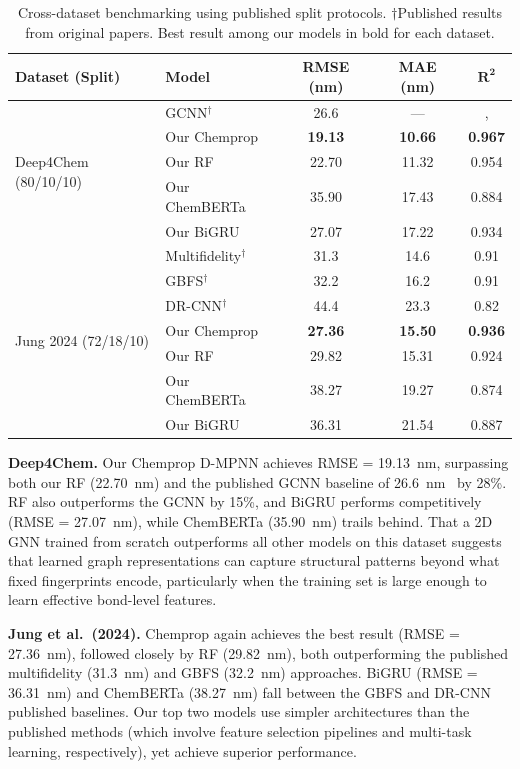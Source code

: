 \documentclass[journal=jcisd8,manuscript=article]{achemso}
\begin{document}
\begin{table}[htbp]
\centering
\caption{Cross-dataset benchmarking using published split protocols. $\dagger$Published results from original papers. Best result among our models in bold for each dataset.}
\label{tab:cross_dataset}
\begin{tabular}{llccc}
\toprule
\textbf{Dataset (Split)} & \textbf{Model} & \textbf{RMSE (nm)} & \textbf{MAE (nm)} & $\boldsymbol{R^2}$ \\
\midrule
\multirow{5}{*}{Deep4Chem (80/10/10)}
 & GCNN$^\dagger$ & 26.6 & --- &, \\
 & Our Chemprop & \textbf{19.13} & \textbf{10.66} & \textbf{0.967} \\
 & Our RF & 22.70 & 11.32 & 0.954 \\
 & Our ChemBERTa & 35.90 & 17.43 & 0.884 \\
 & Our BiGRU & 27.07 & 17.22 & 0.934 \\
\midrule
\multirow{7}{*}{Jung 2024 (72/18/10)}
 & Multifidelity$^\dagger$ & 31.3 & 14.6 & 0.91 \\
 & GBFS$^\dagger$ & 32.2 & 16.2 & 0.91 \\
 & DR-CNN$^\dagger$ & 44.4 & 23.3 & 0.82 \\
 & Our Chemprop & \textbf{27.36} & \textbf{15.50} & \textbf{0.936} \\
 & Our RF & 29.82 & 15.31 & 0.924 \\
 & Our ChemBERTa & 38.27 & 19.27 & 0.874 \\
 & Our BiGRU & 36.31 & 21.54 & 0.887 \\
\bottomrule
\end{tabular}
\end{table}

\textbf{Deep4Chem.}
Our Chemprop D-MPNN achieves RMSE = 19.13~nm, surpassing both our RF (22.70~nm) and the published GCNN baseline of 26.6~nm~\cite{joung2021deep} by 28\%.
RF also outperforms the GCNN by 15\%, and BiGRU performs competitively (RMSE = 27.07~nm), while ChemBERTa (35.90~nm) trails behind.
That a 2D GNN trained from scratch outperforms all other models on this dataset suggests that learned graph representations can capture structural patterns beyond what fixed fingerprints encode, particularly when the training set is large enough to learn effective bond-level features.

\textbf{Jung et al.\ (2024).}
Chemprop again achieves the best result (RMSE = 27.36~nm), followed closely by RF (29.82~nm), both outperforming the published multifidelity (31.3~nm) and GBFS (32.2~nm) approaches.
BiGRU (RMSE = 36.31~nm) and ChemBERTa (38.27~nm) fall between the GBFS and DR-CNN published baselines.
Our top two models use simpler architectures than the published methods (which involve feature selection pipelines and multi-task learning, respectively), yet achieve superior performance.
\end{document}
